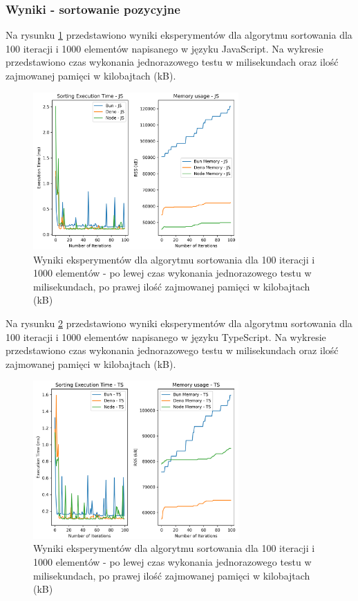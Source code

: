 \subsubsection{Wyniki - sortowanie pozycyjne}
Na rysunku \ref{fig:radix_sorting_e1} przedstawiono wyniki eksperymentów dla algorytmu sortowania  dla 100 iteracji i 1000 elementów napisanego w języku JavaScript. Na wykresie przedstawiono czas wykonania jednorazowego testu w milisekundach oraz ilość zajmowanej pamięci w kilobajtach (kB).

\begin{figure}[H]
  \centering
  \includegraphics[width=0.7\textwidth]{Figures/sorting/sorting_radix_100_1000_js.png}
  \caption{Wyniki eksperymentów dla algorytmu sortowania  dla 100 iteracji i 1000 elementów - po lewej czas wykonania jednorazowego testu w milisekundach, po prawej ilość zajmowanej pamięci w kilobajtach (kB)}
  \label{fig:radix_sorting_e1}
\end{figure}

Na rysunku \ref{fig:radix_sorting_e1_ts} przedstawiono wyniki eksperymentów dla algorytmu sortowania  dla 100 iteracji i 1000 elementów napisanego w języku TypeScript. Na wykresie przedstawiono czas wykonania jednorazowego testu w milisekundach oraz ilość zajmowanej pamięci w kilobajtach (kB).

\begin{figure}[H]
  \centering
  \includegraphics[width=0.7\textwidth]{Figures/sorting/sorting_radix_100_1000_ts.png}
  \caption{Wyniki eksperymentów dla algorytmu sortowania  dla 100 iteracji i 1000 elementów - po lewej czas wykonania jednorazowego testu w milisekundach, po prawej ilość zajmowanej pamięci w kilobajtach (kB)}
  \label{fig:radix_sorting_e1_ts}
\end{figure}

